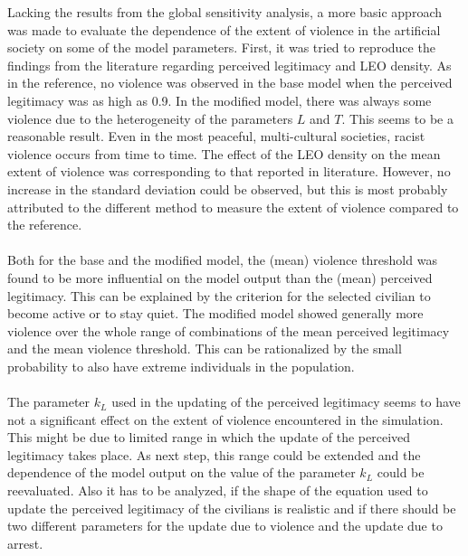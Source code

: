 \documentclass[11pt]{article}
\begin{document}
Lacking the results from the global sensitivity analysis, a more basic approach was made to evaluate the dependence of the extent of violence in the artificial society on some of the model parameters. First, it was tried to reproduce the findings from the literature regarding perceived legitimacy and LEO density. As in the reference, no violence was observed in the base model when the perceived legitimacy was as high as 0.9. In the modified model, there was always some violence due to the heterogeneity of the parameters $L$ and $T$. This seems to be a reasonable result. Even in the most peaceful, multi-cultural societies, racist violence occurs from time to time. The effect of the LEO density on the mean extent of violence was corresponding to that reported in literature. However, no increase in the standard deviation could be observed, but this is most probably attributed to the different method to measure the extent of violence compared to the reference.\\
\\
Both for the base and the modified model, the (mean) violence threshold was found to be more influential on the model output than the (mean) perceived legitimacy. This can be explained by the criterion for the selected civilian to become active or to stay quiet. The modified model showed generally more violence over the whole range of combinations of the mean perceived legitimacy and the mean violence threshold. This can be rationalized by the small probability to also have extreme individuals in the population.\\
\\
The parameter $k_L$ used in the updating of the perceived legitimacy seems to have not a significant effect on the extent of violence encountered in the simulation. This might be due to limited range in which the update of the perceived legitimacy takes place. As next step, this range could be extended and the dependence of the model output on the value of the parameter $k_L$ could be reevaluated. Also it has to be analyzed, if the shape of the equation used to update the perceived legitimacy of the civilians is realistic and if there should be two different parameters for the update due to violence and the update due to arrest.\\
\\
\end{document}
